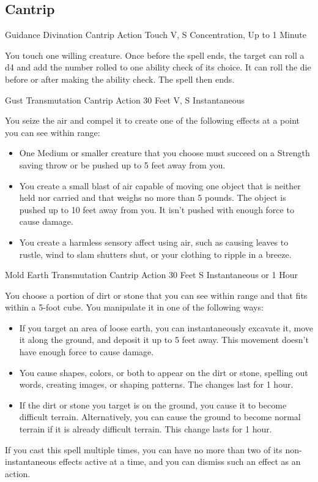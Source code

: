 \documentclass[letterpaper,openany,oneside,twocolumn]{book}
\begin{document}
\subsection*{Cantrip}

\DndSpellHeader
  {Guidance}
  {Divination Cantrip}
  {Action}
  {Touch}
  {V, S}
  {Concentration, Up to 1 Minute}

You touch one willing creature. Once before the spell ends, the target can roll a d4 and add the number rolled to one ability check of its choice. It can roll the die before or after making the ability check. The spell then ends.

\DndSpellHeader
  {Gust}
  {Transmutation Cantrip}
  {Action}
  {30 Feet}
  {V, S}
  {Instantaneous}

You seize the air and compel it to create one of the following effects at a point you can see within range:
\begin{itemize}
	\item One Medium or smaller creature that you choose must succeed on a Strength saving throw or be pushed up to 5 feet away from you.
	\item You create a small blast of air capable of moving one object that is neither held nor carried and that weighs no more than 5 pounds. The object is pushed up to 10 feet away from you. It isn't pushed with enough force to cause damage.
	\item You create a harmless sensory affect using air, such as causing leaves to rustle, wind to slam shutters shut, or your clothing to ripple in a breeze.
\end{itemize}

\DndSpellHeader
  {Mold Earth}
  {Transmutation Cantrip}
  {Action}
  {30 Feet}
  {S}
  {Instantaneous or 1 Hour}

You choose a portion of dirt or stone that you can see within range and that fits within a 5-foot cube. You manipulate it in one of the following ways:
\begin{itemize}
	\item If you target an area of loose earth, you can instantaneously excavate it, move it along the ground, and deposit it up to 5 feet away. This movement doesn't have enough force to cause damage.
	\item You cause shapes, colors, or both to appear on the dirt or stone, spelling out words, creating images, or shaping patterns. The changes last for 1 hour.
	\item If the dirt or stone you target is on the ground, you cause it to become difficult terrain. Alternatively, you can cause the ground to become normal terrain if it is already difficult terrain. This change lasts for 1 hour.
\end{itemize}
If you cast this spell multiple times, you can have no more than two of its non-instantaneous effects active at a time, and you can dismiss such an effect as an action.
\end{document}
